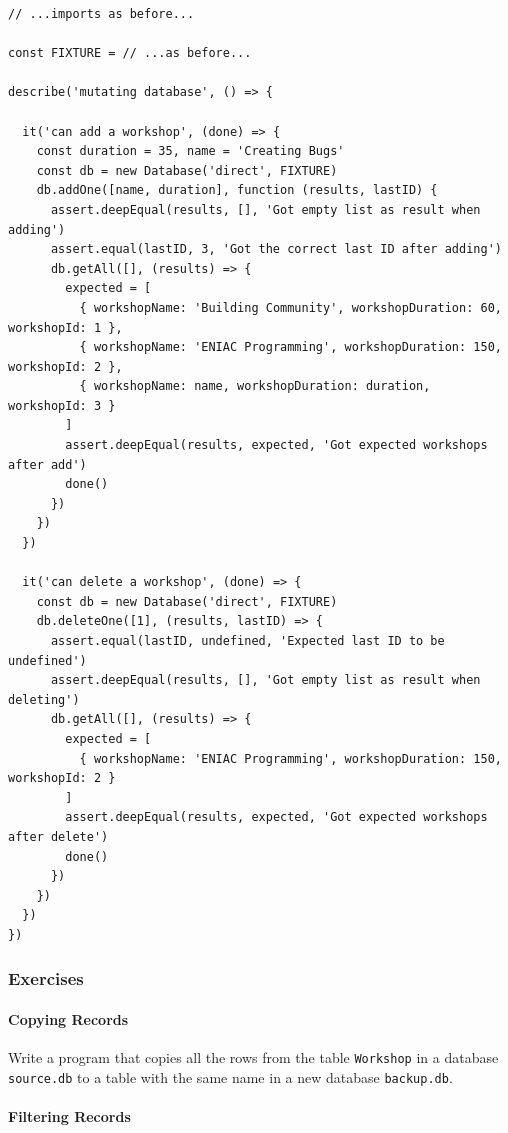 \begin{verbatim}
// ...imports as before...

const FIXTURE = // ...as before...

describe('mutating database', () => {

  it('can add a workshop', (done) => {
    const duration = 35, name = 'Creating Bugs'
    const db = new Database('direct', FIXTURE)
    db.addOne([name, duration], function (results, lastID) {
      assert.deepEqual(results, [], 'Got empty list as result when adding')
      assert.equal(lastID, 3, 'Got the correct last ID after adding')
      db.getAll([], (results) => {
        expected = [
          { workshopName: 'Building Community', workshopDuration: 60, workshopId: 1 },
          { workshopName: 'ENIAC Programming', workshopDuration: 150, workshopId: 2 },
          { workshopName: name, workshopDuration: duration, workshopId: 3 }
        ]
        assert.deepEqual(results, expected, 'Got expected workshops after add')
        done()
      })
    })
  })

  it('can delete a workshop', (done) => {
    const db = new Database('direct', FIXTURE)
    db.deleteOne([1], (results, lastID) => {
      assert.equal(lastID, undefined, 'Expected last ID to be undefined')
      assert.deepEqual(results, [], 'Got empty list as result when deleting')
      db.getAll([], (results) => {
        expected = [
          { workshopName: 'ENIAC Programming', workshopDuration: 150, workshopId: 2 }
        ]
        assert.deepEqual(results, expected, 'Got expected workshops after delete')
        done()
      })
    })
  })
})
\end{verbatim}

\subsubsection{Exercises}\label{s:db-exercises}

\paragraph{Copying Records}\label{copying-records}

Write a program that copies all the rows from the table
\texttt{Workshop} in a database \texttt{source.db} to a table with the
same name in a new database \texttt{backup.db}.

\paragraph{Filtering Records}\label{filtering-records}

